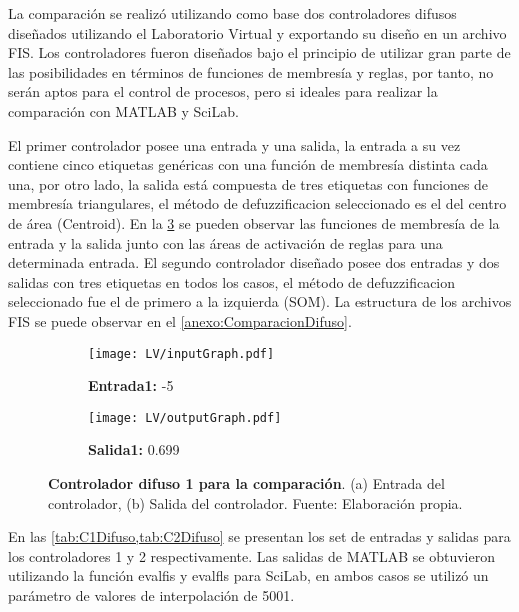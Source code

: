         La comparación se realizó utilizando como base dos controladores difusos diseñados utilizando el Laboratorio Virtual y exportando su diseño en un archivo FIS. Los controladores fueron diseñados bajo el principio de utilizar gran parte de las posibilidades en términos de funciones de membresía y reglas, por tanto, no serán aptos para el control de procesos, pero si ideales para realizar la comparación con MATLAB y SciLab.

        El primer controlador posee una entrada y una salida, la entrada a su vez contiene cinco etiquetas genéricas con una función de membresía distinta cada una, por otro lado, la salida está compuesta de tres etiquetas con funciones de membresía triangulares, el método de defuzzificacion seleccionado es el del centro de área (Centroid). En la \cref{fig:controladorDifuso} se pueden observar las funciones de membresía de la entrada y la salida junto con las áreas de activación de reglas para una determinada entrada. El segundo controlador diseñado posee dos entradas y dos salidas con tres etiquetas en todos los casos, el método de defuzzificacion seleccionado fue el de primero a la izquierda (SOM). La estructura de los archivos FIS se puede observar en el \ref{anexo:ComparacionDifuso}.

        \vspace{10pt}

        \begin{figure}[htb]
            \centering
            \begin{subfigure}[t]{0.49\textwidth}
                \centering
                \texttt{[image: LV/inputGraph.pdf]}
                \caption{\textbf{Entrada1:} -5}
                \label{fig:inputGraph}
            \end{subfigure}
            \hfill
            \begin{subfigure}[t]{0.49\textwidth}
                \centering
                \texttt{[image: LV/outputGraph.pdf]}
                \caption{\textbf{Salida1:} 0.699}
                \label{fig:outputGraph}
            \end{subfigure}
            
            \caption[Controlador difuso 1 para la comparación]{\textbf{Controlador difuso 1 para la comparación}. (a) Entrada del controlador, (b) Salida del controlador. Fuente: Elaboración propia. \label{fig:controladorDifuso}}
        \end{figure}

        En las \cref{tab:C1Difuso,tab:C2Difuso} se presentan los set de entradas y salidas para los controladores 1 y 2 respectivamente. Las salidas de MATLAB se obtuvieron utilizando la función evalfis y evalfls para SciLab, en ambos casos se utilizó un parámetro de valores de interpolación de 5001.

